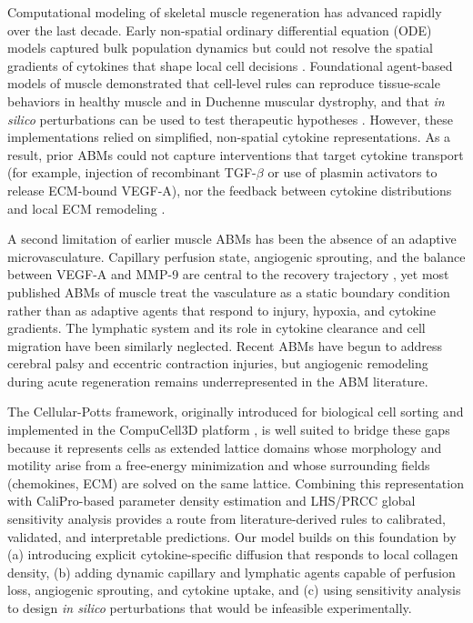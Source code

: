 \documentclass[10pt,letterpaper]{article}
\begin{document}
Computational modeling of skeletal muscle regeneration has advanced rapidly over the last decade. Early non-spatial ordinary differential equation (ODE) models captured bulk population dynamics but could not resolve the spatial gradients of cytokines that shape local cell decisions \cite{hillen2009user}. Foundational agent-based models of muscle demonstrated that cell-level rules can reproduce tissue-scale behaviors in healthy muscle and in Duchenne muscular dystrophy, and that \emph{in silico} perturbations can be used to test therapeutic hypotheses \cite{virgilio2015multiscale,martin2017agent}. However, these implementations relied on simplified, non-spatial cytokine representations. As a result, prior ABMs could not capture interventions that target cytokine transport (for example, injection of recombinant TGF-$\beta$ or use of plasmin activators to release ECM-bound VEGF-A), nor the feedback between cytokine distributions and local ECM remodeling \cite{urciuolo2013collagen}.

A second limitation of earlier muscle ABMs has been the absence of an adaptive microvasculature. Capillary perfusion state, angiogenic sprouting, and the balance between VEGF-A and MMP-9 are central to the recovery trajectory \cite{carmeliet2003angiogenesis}, yet most published ABMs of muscle treat the vasculature as a static boundary condition rather than as adaptive agents that respond to injury, hypoxia, and cytokine gradients. The lymphatic system and its role in cytokine clearance and cell migration have been similarly neglected. Recent ABMs have begun to address cerebral palsy and eccentric contraction injuries, but angiogenic remodeling during acute regeneration remains underrepresented in the ABM literature.

The Cellular-Potts framework, originally introduced for biological cell sorting \cite{graner1992simulation} and implemented in the CompuCell3D platform \cite{swat2012compucell3d}, is well suited to bridge these gaps because it represents cells as extended lattice domains whose morphology and motility arise from a free-energy minimization and whose surrounding fields (chemokines, ECM) are solved on the same lattice. Combining this representation with CaliPro-based parameter density estimation \cite{joslyn2021calipro} and LHS/PRCC global sensitivity analysis \cite{marino2008sensitivity} provides a route from literature-derived rules to calibrated, validated, and interpretable predictions. Our model builds on this foundation by (a) introducing explicit cytokine-specific diffusion that responds to local collagen density, (b) adding dynamic capillary and lymphatic agents capable of perfusion loss, angiogenic sprouting, and cytokine uptake, and (c) using sensitivity analysis to design \emph{in silico} perturbations that would be infeasible experimentally.
\end{document}
